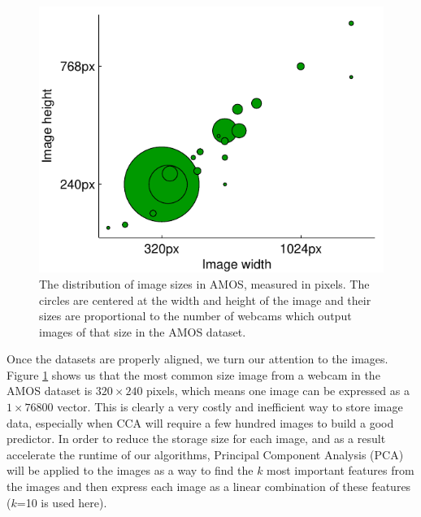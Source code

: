 \begin{figure}
	\centering
		\includegraphics{figures/imagedimensions.pdf}
	\caption[The distribution of image sizes in AMOS, measured in pixels]{The distribution of image sizes in AMOS, measured in pixels. The circles are centered at the width and height of the image and their sizes are proportional to the number of webcams which output images of that size in the AMOS dataset.}
	\label{fig:imagedimensions}
\end{figure}

Once the datasets are properly aligned, we turn our attention to the images. Figure \ref{fig:imagedimensions} shows us that the most common size image from a webcam in the AMOS dataset is $320\times 240$ pixels, which means one image can be expressed as a $1\times 76800$ vector. This is clearly a very costly and inefficient way to store image data, especially when CCA will require a few hundred images to build a good predictor. In order to reduce the storage size for each image, and as a result accelerate the runtime of our algorithms, Principal Component Analysis (PCA) will be applied to the images as a way to find the $k$ most important features from the images and then express each image as a linear combination of these features ($k$=10 is used here). 


